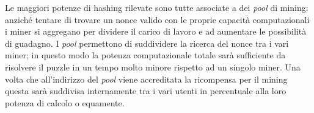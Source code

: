 Le maggiori potenze di hashing rilevate sono tutte associate a dei \textit{pool} di mining: anziché tentare di trovare un nonce valido con le proprie capacità computazionali i miner si aggregano per dividere il carico di lavoro e ad aumentare le possibilità di guadagno. I \textit{pool} permettono di suddividere la ricerca del nonce tra i vari miner; in questo modo la potenza computazionale totale sarà sufficiente da risolvere il puzzle in un tempo molto minore rispetto ad un singolo miner. Una volta che all'indirizzo del \textit{pool} viene accreditata la ricompensa per il mining questa sarà suddivisa internamente tra i vari utenti in percentuale alla loro potenza di calcolo o equamente.

